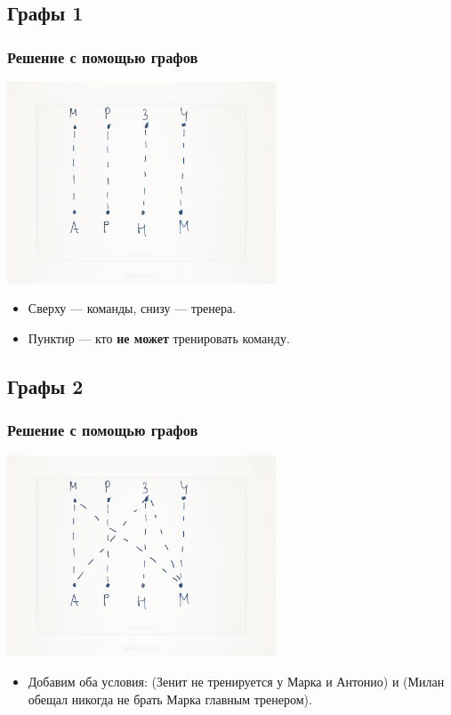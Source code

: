 \documentclass[compress,red]{beamer}
\begin{document}
\subsection{Графы 1}
\begin{frame}[fragile]
  \frametitle{Решение с помощью графов}
  \centerline{\includegraphics[width=0.6\textwidth]{images/graph-01.png}}
  \begin{itemize}
    \item Сверху --- команды, снизу --- тренера.
    \item Пунктир --- кто \textbf{не может} тренировать команду.
  \end{itemize}
\end{frame}

\subsection{Графы 2}
\begin{frame}[fragile]
  \frametitle{Решение с помощью графов}
  \centerline{\includegraphics[width=0.6\textwidth]{images/graph-02.png}}
  \begin{itemize}
    \item Добавим оба условия: (Зенит не тренируется у Марка и Антонио) и (Милан обещал никогда не брать Марка главным тренером).
  \end{itemize}
\end{frame}
\end{document}
